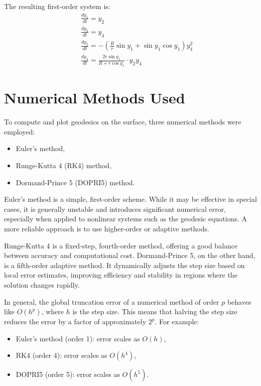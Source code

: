 \documentclass{article}
\begin{document}
			The resulting first-order system is:
			\begin{align*}
				\quad & \frac{dy_1}{dt} = y_2 \\
				\quad & \frac{dy_3}{dt} = y_4 \\
				\quad & \frac{dy_2}{dt} = -\left( \frac{R}{r} \sin y_1 + \sin y_1 \cos y_1 \right) y_4^2 \\
				\quad & \frac{dy_4}{dt} = \frac{2r \sin y_1}{R + r \cos y_1} \cdot y_2 y_4
			\end{align*}
			\newpage
	\section{Numerical Methods Used}
	
	To compute and plot geodesics on the surface, three numerical methods were employed:
	\begin{itemize}
		\item Euler's method,
		\item Runge-Kutta 4 (RK4) method,
		\item Dormand-Prince 5 (DOPRI5) method.
	\end{itemize}
	
	Euler's method is a simple, first-order scheme. While it may be effective in special cases, it is generally unstable and introduces significant numerical error, especially when applied to nonlinear systems such as the geodesic equations. A more reliable approach is to use higher-order or adaptive methods.
	
	Runge-Kutta 4 is a fixed-step, fourth-order method, offering a good balance between accuracy and computational cost. Dormand-Prince 5, on the other hand, is a fifth-order adaptive method. It dynamically adjusts the step size based on local error estimates, improving efficiency and stability in regions where the solution changes rapidly.
	
	In general, the global truncation error of a numerical method of order $p$ behaves like $O(h^p)$, where $h$ is the step size. This means that halving the step size reduces the error by a factor of approximately $2^p$. For example:
	\begin{itemize}
		\item Euler's method (order 1): error scales as $O(h)$,
		\item RK4 (order 4): error scales as $O(h^4)$,
		\item DOPRI5 (order 5): error scales as $O(h^5)$.
	\end{itemize}
	
\end{document}
